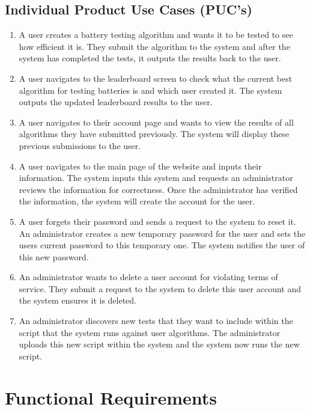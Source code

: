 \documentclass[12pt]{article}
\begin{document}
\subsection{Individual Product Use Cases (PUC's)}
\begin{enumerate}
    \item A user creates a battery testing algorithm and wants it to be tested to see how efficient it is. They submit the algorithm to the system and after the system has completed the tests, it outputs the results back to the user.
    \item A user navigates to the leaderboard screen to check what the current best algorithm for testing batteries is and which user created it. The system outputs the updated leaderboard results to the user.
    \item A user navigates to their account page and wants to view the results of all algorithms they have submitted previously. The system will display these previous submissions to the user.
    \item A user navigates to the main page of the website and inputs their information. The system inputs this system and requests an administrator reviews the information for correctness. Once the administrator has verified the information, the system will create the account for the user.
    \item A user forgets their password and sends a request to the system to reset it. An administrator creates a new temporary password for the user and sets the users current password to this temporary one. The system notifies the user of this new password.
    \item An administrator wants to delete a user account for violating terms of service. They submit a request to the system to delete this user account and the system ensures it is deleted.
    \item An administrator discovers new tests that they want to include within the script that the system runs against user algorithms. The administrator uploads this new script within the system and the system now runs the new script.
\end{enumerate}


\section{Functional Requirements}
\end{document}
